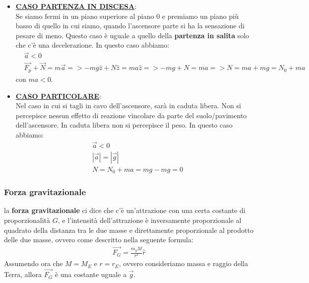 \begin{itemize}
                    \item \underline{\textbf{CASO PARTENZA IN DISCESA}}:\\
                    Se siamo fermi in un piano superiore al piano 0 e premiamo un piano più basso di quello in cui siamo, quando l'ascensore parte si ha la sensazione di pesare di meno. Questo caso è uguale a quello della \textbf{partenza in salita} solo che c'è una decelerazione.
                    In questo caso abbiamo:
                    \begin{align*}
                        &\vec{a}<0\\
                        &\vec{F_p}+\vec{N}=m\vec{a} => -mg\hat{z}+N\hat{z}=ma\hat{z} => -mg+N=ma => N=ma+mg = N_0 + ma
                    \end{align*}
                    con $ma < 0$.

                    \item \underline{\textbf{CASO PARTICOLARE}}:\\
                    Nel caso in cui si tagli in cavo dell'ascensore, sarà in caduta libera. Non si percepisce nessun effetto di reazione vincolare da parte del suolo/pavimento dell'ascensore. In caduta libera non si percepisce il peso.
                    In questo caso abbiamo:
                    \begin{align*}
                        &\vec{a}<0\\
                        &|\vec{a}|=|\vec{g}|\\
                        &N = N_0 + ma = mg-mg=0
                    \end{align*}
                \end{itemize}



        \subsubsection{Forza gravitazionale}
            la \textbf{forza gravitazionale} ci dice che c'è un'attrazione con una certa costante di proporzionalità $G$, e l'intensità dell'attrazione è inversamente proporzionale al quadrato della distanza tra le due masse e direttamente proporzionale al prodotto delle due masse, ovvero come descritto nella seguente formula:
            \begin{align*}
                \vec{F_G} = \frac{m_g M}{r^2}\hat{r}
            \end{align*}
            Assumendo ora che $M=M_E$ e $r=r_E$, ovvero consideriamo massa e raggio della Terra, allora $\vec{F_G}$ è una costante uguale a $\vec{g}$.

